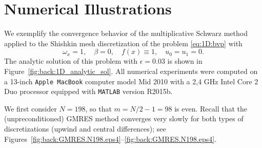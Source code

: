 \section{Numerical Illustrations}
\label{1D:NumericsA}

We exemplify the convergence behavior of the multiplicative
Schwarz method applied to the Shishkin mesh discretization of the problem
\eqref{eq:1D:bvp} with
%
$$\omega_x=1,\quad \beta=0,\quad f(x)\equiv 1,\quad u_0=u_1=0.$$
%
The analytic solution of this problem with $\epsilon=0.03$
is shown in Figure~\ref{fig:back:1D_analytic_sol}. All numerical experiments were computed on a 13-inch \texttt{Apple MacBook} computer model Mid 2010 with a 2,4 GHz Intel Core 2 Duo processor equipped with \texttt{MATLAB} version R2015b.

We first consider $N=198$, so that $m=N/2-1=98$ is even. Recall that the
(unpreconditioned) GMRES method converges very slowly for both types of
discretizations (upwind and central differences); see Figures~\ref{fig:back:GMRES.N198.eps4}--\ref{fig:back:GMRES.N198.eps4}.

